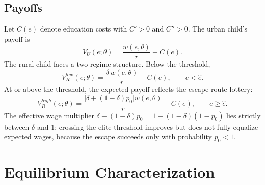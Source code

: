 \documentclass[12pt]{article}
\theoremstyle{plain}
\theoremstyle{definition}
\theoremstyle{remark}
\begin{document}
\subsection{Payoffs}

Let $C(e)$ denote education costs with $C'>0$ and $C''>0$.  The urban child's
payoff is
\begin{equation}
  V_{U}(e;\theta)=\frac{w(e,\theta)}{r}-C(e).
  \label{eq:Vu}
\end{equation}
The rural child faces a two-regime structure.  Below the threshold,
\begin{equation}
  V_{R}^{low}(e;\theta)=\frac{\delta\,w(e,\theta)}{r}-C(e),\qquad e<\hat{e}.
  \label{eq:Vlow}
\end{equation}
At or above the threshold, the expected payoff reflects the escape-route lottery:
\begin{equation}
  \boxed{V_{R}^{high}(e;\theta)=
    \frac{\bigl[\delta+(1-\delta)p_{0}\bigr]w(e,\theta)}{r}-C(e),\qquad
    e\geq\hat{e}.}
  \label{eq:Vhigh}
\end{equation}
The effective wage multiplier $\delta+(1-\delta)p_{0}=1-(1-\delta)(1-p_{0})$
lies strictly between $\delta$ and $1$: crossing the elite threshold improves
but does not fully equalize expected wages, because the escape succeeds only with
probability $p_{0}<1$.

\section{Equilibrium Characterization}
\end{document}
